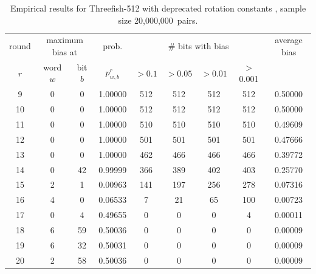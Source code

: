 \documentclass[11pt,twoside]{article}
\begin{document}
\begin{table}[tbh]
 \centering
\begin{tabular}{|c|ccc|cccc|c|}
\hline
round & \multicolumn{ 2}{c}{maximum bias at}& prob. & \multicolumn{ 4}{c|}{\# bits with bias} &
average bias \\
$r$ & word $w$ & bit $b$ & $p^r_{w,b}$ & $>0.1$ & $>0.05$ & $>0.01$ & $>$ 0.001 & \\  \hline
9 &  0 &  0 &    1.00000 &  512 &  512 &  512 &  512 &    0.50000 \\ \hline
10 &  0 &  0 &    1.00000 &  512 &  512 &  512 &  512 &    0.50000 \\ \hline
11 &  0 &  0 &    1.00000 &  510 &  510 &  510 &  510 &    0.49609 \\ \hline
12 &  0 &  0 &    1.00000 &  501 &  501 &  501 &  501 &    0.47666 \\ \hline
13 &  0 &  0 &    1.00000 &  462 &  466 &  466 &  466 &    0.39772 \\ \hline
14 &  0 &  42 &    0.99999 &  366 &  389 &  402 &  403 &    0.25770 \\ \hline
15 &  2 &  1 &    0.00963 &  141 &  197 &  256 &  278 &    0.07316 \\ \hline
16 &  4 &  0 &    0.06533 &  7 &  21 &  65 &  100 &    0.00723 \\ \hline
17 &  0 &  4 &    0.49655 &  0 &  0 &  0 &  4 &    0.00011 \\ \hline
18 &  6 &  59 &    0.50036 &  0 &  0 &  0 &  0 &    0.00009 \\ \hline
19 &  6 &  32 &    0.50031 &  0 &  0 &  0 &  0 &    0.00009 \\ \hline
20 &  2 &  58 &    0.50036 &  0 &  0 &  0 &  0 &    0.00009 \\ \hline
\end{tabular}
\caption{Empirical results for Threefish-512 with deprecated rotation constants \cite{MartinKausche2008}, sample size 20,000,000~pairs.}
\label{tab:KauscheObservationsFor512}
\end{table}
\end{document}
